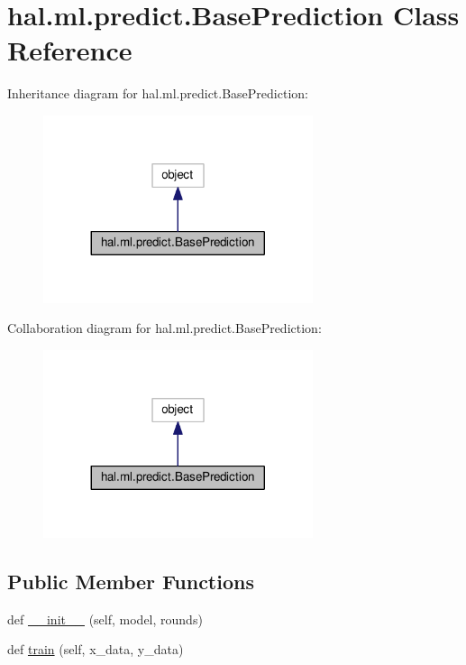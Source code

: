 \hypertarget{classhal_1_1ml_1_1predict_1_1_base_prediction}{}\section{hal.\+ml.\+predict.\+Base\+Prediction Class Reference}
\label{classhal_1_1ml_1_1predict_1_1_base_prediction}


Inheritance diagram for hal.\+ml.\+predict.\+Base\+Prediction\+:\nopagebreak
\begin{figure}[H]
\begin{center}
\leavevmode
\includegraphics[width=224pt]{classhal_1_1ml_1_1predict_1_1_base_prediction__inherit__graph}
\end{center}
\end{figure}


Collaboration diagram for hal.\+ml.\+predict.\+Base\+Prediction\+:\nopagebreak
\begin{figure}[H]
\begin{center}
\leavevmode
\includegraphics[width=224pt]{classhal_1_1ml_1_1predict_1_1_base_prediction__coll__graph}
\end{center}
\end{figure}
\subsection*{Public Member Functions}
\begin{DoxyCompactItemize}
\item 
def \hyperlink{classhal_1_1ml_1_1predict_1_1_base_prediction_a77743bfb5de4846d30d3f41e7d2706df}{\+\_\+\+\_\+init\+\_\+\+\_\+} (self, model, rounds)
\item 
def \hyperlink{classhal_1_1ml_1_1predict_1_1_base_prediction_a90eb15f55979578ecc9bed343068f2ce}{train} (self, x\+\_\+data, y\+\_\+data)
\end{DoxyCompactItemize}
